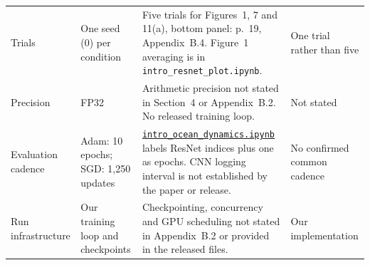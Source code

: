 \documentclass{article}
\begin{document}
\begin{longtable}{@{}>{\raggedright\arraybackslash}p{}>{\raggedright\arraybackslash}p{}>{\raggedright\arraybackslash}p{}>{\raggedright\arraybackslash}p{}@{}}
Trials & One seed (0) per condition & Five trials for Figures~1, 7 and 11(a), bottom panel: p.~19, Appendix~B.4. Figure~1 averaging is in \texttt{intro\_resnet\_plot.ipynb}. & One trial rather than five\\
Precision & FP32 & Arithmetic precision not stated in Section~4 or Appendix~B.2. No released training loop. & Not stated\\
Evaluation cadence & Adam: 10 epochs; SGD: 1,250 updates & \href{https://gitlab.com/harvard-machine-learning/double-descent/-/blob/0d653296f870e6bf7ee82dc71b4f7b49d53fa85d/intro_ocean_dynamics.ipynb}{\texttt{intro\_ocean\_dynamics.ipynb}} labels ResNet indices plus one as epochs. CNN logging interval is not established by the paper or release. & No confirmed common cadence\\
Run infrastructure & Our training loop and checkpoints & Checkpointing, concurrency and GPU scheduling not stated in Appendix~B.2 or provided in the released files. & Our implementation\\
\end{longtable}
\clearpage
\end{document}
